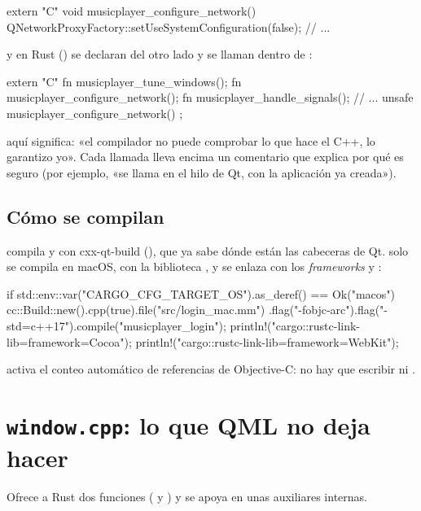 \begin{codigo}
extern "C" void musicplayer_configure_network()
{
    QNetworkProxyFactory::setUseSystemConfiguration(false);
    // ...
}
\end{codigo}

y en Rust () se declaran del otro lado y se llaman dentro de
:

\begin{rust}
extern "C" {
    fn musicplayer_tune_windows();
    fn musicplayer_configure_network();
    fn musicplayer_handle_signals();
}
// ...
unsafe { musicplayer_configure_network() };
\end{rust}

 aquí significa: «el compilador no puede comprobar lo que hace el C++, lo
garantizo yo». Cada llamada lleva encima un comentario  que explica por qué
es seguro (por ejemplo, «se llama en el hilo de Qt, con la aplicación ya creada»).

\subsection{Cómo se compilan}

 compila  y  con cxx-qt-build
(), que ya sabe dónde están las cabeceras de Qt. 
solo se compila en macOS, con la biblioteca , y se enlaza con los \emph{frameworks}
 y :

\begin{rust}
if std::env::var("CARGO_CFG_TARGET_OS").as_deref() == Ok("macos") {
    cc::Build::new().cpp(true).file("src/login_mac.mm")
        .flag("-fobjc-arc").flag("-std=c++17").compile("musicplayer_login");
    println!("cargo::rustc-link-lib=framework=Cocoa");
    println!("cargo::rustc-link-lib=framework=WebKit");
}
\end{rust}

 activa el conteo automático de referencias de Objective-C: no hay que
escribir  ni .

\section{\texttt{window.cpp}: lo que QML no deja hacer}

Ofrece a Rust dos funciones ( y
) y se apoya en unas auxiliares internas.

